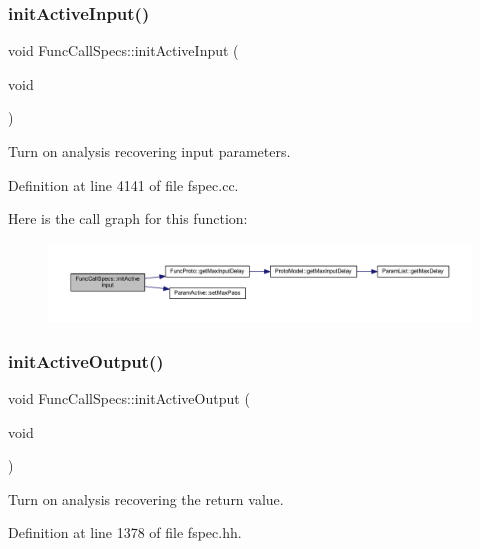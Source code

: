 \subsubsection{\texorpdfstring{initActiveInput()}{initActiveInput()}}
{\footnotesize\ttfamily void Func\+Call\+Specs\+::init\+Active\+Input (\begin{DoxyParamCaption}\item[{void}]{ }\end{DoxyParamCaption})}



Turn on analysis recovering input parameters. 



Definition at line 4141 of file fspec.\+cc.

Here is the call graph for this function\+:
\nopagebreak
\begin{figure}[H]
\begin{center}
\leavevmode
\includegraphics[width=350pt]{class_func_call_specs_a0b481b6be0cc41e4f1b35089fc5f192b_cgraph}
\end{center}
\end{figure}
\mbox{\label{class_func_call_specs_a87904aacb6678c8bde4c0c2c781db830}} 
\subsubsection{\texorpdfstring{initActiveOutput()}{initActiveOutput()}}
{\footnotesize\ttfamily void Func\+Call\+Specs\+::init\+Active\+Output (\begin{DoxyParamCaption}\item[{void}]{ }\end{DoxyParamCaption})\hspace{0.3cm}{\ttfamily [inline]}}



Turn on analysis recovering the return value. 



Definition at line 1378 of file fspec.\+hh.

\mbox{\label{class_func_call_specs_aae6a890aaa82deca59ec7c57c92629aa}} 
